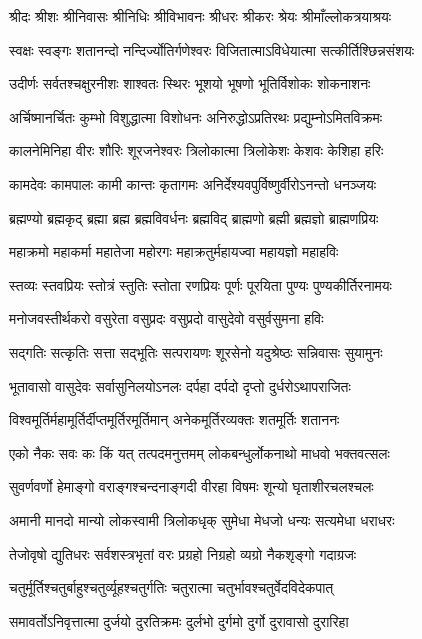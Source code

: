 \twolineshloka
{श्रीदः श्रीशः श्रीनिवासः श्रीनिधिः श्रीविभावनः}
{श्रीधरः श्रीकरः श्रेयः श्रीमाँल्लोकत्रयाश्रयः}

\twolineshloka
{स्वक्षः स्वङ्गः शतानन्दो नन्दिर्ज्योतिर्गणेश्वरः}
{विजितात्माऽविधेयात्मा सत्कीर्तिश्छिन्नसंशयः}

\twolineshloka
{उदीर्णः सर्वतश्चक्षुरनीशः शाश्वतः स्थिरः}
{भूशयो भूषणो भूतिर्विशोकः शोकनाशनः}

\twolineshloka
{अर्चिष्मानर्चितः कुम्भो विशुद्धात्मा विशोधनः}
{अनिरुद्धोऽप्रतिरथः प्रद्युम्नोऽमितविक्रमः}

\twolineshloka
{कालनेमिनिहा वीरः शौरिः शूरजनेश्वरः}
{त्रिलोकात्मा त्रिलोकेशः केशवः केशिहा हरिः}

\twolineshloka
{कामदेवः कामपालः कामी कान्तः कृतागमः}
{अनिर्देश्यवपुर्विष्णुर्वीरोऽनन्तो धनञ्जयः}

\twolineshloka
{ब्रह्मण्यो ब्रह्मकृद् ब्रह्मा ब्रह्म ब्रह्मविवर्धनः}
{ब्रह्मविद् ब्राह्मणो ब्रह्मी ब्रह्मज्ञो ब्राह्मणप्रियः}

\twolineshloka
{महाक्रमो महाकर्मा महातेजा महोरगः}
{महाक्रतुर्महायज्वा महायज्ञो महाहविः}

\twolineshloka
{स्तव्यः स्तवप्रियः स्तोत्रं स्तुतिः स्तोता रणप्रियः}
{पूर्णः पूरयिता पुण्यः पुण्यकीर्तिरनामयः}

\twolineshloka
{मनोजवस्तीर्थकरो वसुरेता वसुप्रदः}
{वसुप्रदो वासुदेवो वसुर्वसुमना हविः}

\twolineshloka
{सद्गतिः सत्कृतिः सत्ता सद्भूतिः सत्परायणः}
{शूरसेनो यदुश्रेष्ठः सन्निवासः सुयामुनः}

\twolineshloka
{भूतावासो वासुदेवः सर्वासुनिलयोऽनलः}
{दर्पहा दर्पदो दृप्तो दुर्धरोऽथापराजितः}

\twolineshloka
{विश्वमूर्तिर्महामूर्तिर्दीप्तमूर्तिरमूर्तिमान्}
{अनेकमूर्तिरव्यक्तः शतमूर्तिः शताननः}

\twolineshloka
{एको नैकः सवः कः किं यत् तत्पदमनुत्तमम्}
{लोकबन्धुर्लोकनाथो माधवो भक्तवत्सलः}

\twolineshloka
{सुवर्णवर्णो हेमाङ्गो वराङ्गश्चन्दनाङ्गदी}
{वीरहा विषमः शून्यो घृताशीरचलश्चलः}

\twolineshloka
{अमानी मानदो मान्यो लोकस्वामी त्रिलोकधृक्}
{सुमेधा मेधजो धन्यः सत्यमेधा धराधरः}

\twolineshloka
{तेजोवृषो द्युतिधरः सर्वशस्त्रभृतां वरः}
{प्रग्रहो निग्रहो व्यग्रो नैकशृङ्गो गदाग्रजः}

\twolineshloka
{चतुर्मूर्तिश्चतुर्बाहुश्चतुर्व्यूहश्चतुर्गतिः}
{चतुरात्मा चतुर्भावश्चतुर्वेदविदेकपात्}

\twolineshloka
{समावर्तोऽनिवृत्तात्मा दुर्जयो दुरतिक्रमः}
{दुर्लभो दुर्गमो दुर्गो दुरावासो दुरारिहा}

